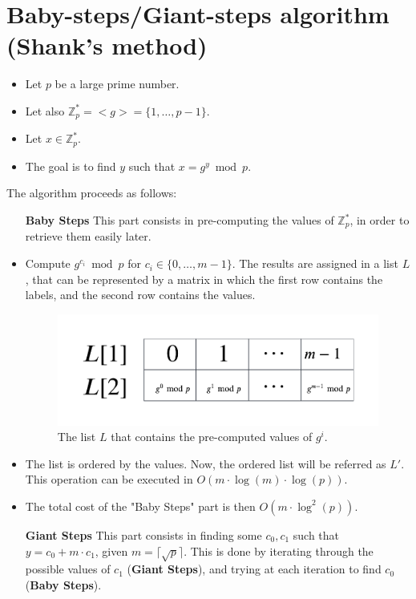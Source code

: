\section{Baby-steps/Giant-steps algorithm (Shank's method)}
\begin{itemize}
    \item Let $p$ be a large prime number.
    \item Let also $\mathbb{Z}_{p}^{*} = <g> = \{1, \dots, p-1\}$.
    \item Let $x \in \mathbb{Z}_{p}^{*}$.
    \item The goal is to find $y$ such that $x = g^{y} \bmod p$.
\end{itemize}
The algorithm proceeds as follows:
\begin{itemize}
    \item[\textbf{Baby Steps}] This part consists in pre-computing the values of $\mathbb{Z}_{p}^{*}$, in order to retrieve them easily later.
    \item Compute $g^{c_{i}} \bmod p$ for $c_{i} \in \{0, \dots, m - 1\}$. The results are assigned in a list $L$, that can be represented by a matrix in which the first row contains the labels, and the second row contains the values.
    \begin{figure}[h]
        \centering
        \includegraphics[width=\textwidth]{img/bsgs_L.png}
        \caption{The list $L$ that contains the pre-computed values of $g^{i}$.}
    \end{figure}
    \item The list is ordered by the values. Now, the ordered list will be referred as $L'$. This operation can be executed in $O(m \cdot \operatorname{log}(m) \cdot \operatorname{log}(p))$.
    \item The total cost of the "Baby Steps" part is then $O(m \cdot \operatorname{log}^{2}(p))$.
    \item[\textbf{Giant Steps}] This part consists in finding some $c_0, c_1$ such that $y = c_0 + m \cdot c_1$, given $m = \lceil \sqrt{p} \rceil$. This is done by iterating through the possible values of $c_1$ (\textbf{Giant Steps}), and trying at each iteration to find $c_0$ (\textbf{Baby Steps}).

\end{itemize}
